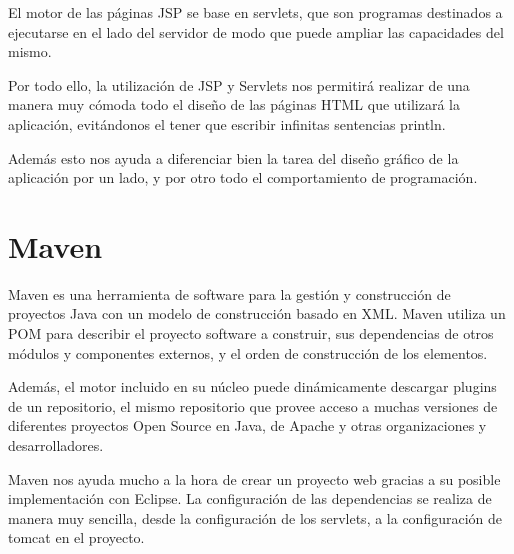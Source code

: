 El motor de las páginas JSP se base en servlets, que son programas destinados a ejecutarse en el lado del servidor de modo que puede ampliar las capacidades del mismo.

Por todo ello, la utilización de JSP y Servlets nos permitirá realizar de una manera muy cómoda todo el diseño de las páginas HTML que utilizará la aplicación, evitándonos el tener que escribir infinitas sentencias println. 

Además esto nos ayuda a diferenciar bien la tarea del diseño gráfico de la aplicación por un lado, y por otro todo el comportamiento de programación.

\section{Maven} 

Maven es una herramienta de software para la gestión y construcción de proyectos Java con un modelo de construcción basado en XML. Maven utiliza un POM para describir el proyecto software a construir, sus dependencias de otros módulos y componentes externos, y el orden de construcción de los elementos. 

Además, el motor incluido en su núcleo puede dinámicamente descargar plugins de un repositorio, el mismo repositorio que provee acceso a muchas versiones de diferentes proyectos Open Source en Java, de Apache y otras organizaciones y desarrolladores. \cite{wiki:maven}

Maven nos ayuda mucho a la hora de crear un proyecto web gracias a su posible implementación con Eclipse. La configuración de las dependencias se realiza de manera muy sencilla, desde la configuración de los servlets, a la configuración de tomcat en el proyecto.

